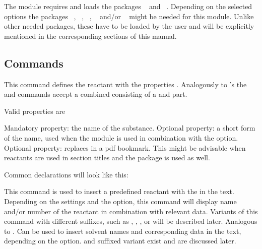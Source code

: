 \documentclass{chemmacros-manual}
\begin{document}
The module requires and loads the packages ~\cite{pkg:chemnum} and
~\cite{pkg:siunitx}. Depending on the selected options the packages 
~\cite{pkg:acro}, ~\cite{pkg:glossaries-extra}, ~\cite{pkg:hyperref}, ~\cite{pkg:longtable} and/or 
~\cite{pkg:xltabular} might be needed for this module. Unlike 
other needed packages, these have to be loaded by the user and will be explicitly 
mentioned in the corresponding sections of this manual.

\subsection{Commands}

\begin{commands}
    This command defines the reactant  with the properties
    .
    Analogously to 's  the  and
     commands accept a combined  consisting of a
     and  part.
\end{commands}
Valid properties are
\begin{options}
    Mandatory property: the name of the substance.
    Optional property: a short form of the name, used when the  module is used
    in combination with the  option.
    Optional property: replaces  in a \ac{pdf} bookmark.  This might be advisable when
    reactants are used in section titles and the  package is used as
    well.
    
\end{options}

Common declarations will look like this:
\begin{sourcecode}
\end{sourcecode}

\begin{commands}
  This command is used to insert a predefined reactant with the  in the 
  text. Depending on the settings and the  option, 
  this command will display name and/or number of the reactant in combination  
  with relevant data. Variants of this command with different suffixes, such as 
  \code{*}, \code{+}, ,  or  will be described later.
  Analogous to . Can be used to insert solvent names and corresponding 
  data in the text, depending on the  option.  
  and  suffixed variant exist and are discussed later.
\end{commands}
\end{document}
